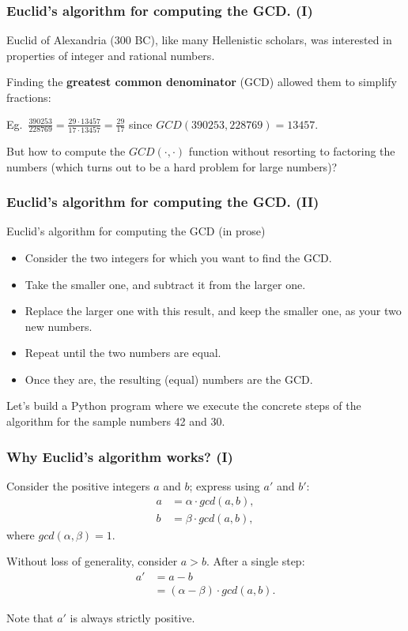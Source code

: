 \documentclass{beamer} %
\newcommand\emc[1]{\textcolor{brightblue}{\textbf{#1}}}
\begin{document}
\begin{frame}
\frametitle{Euclid's algorithm for computing the GCD. (I)} 

Euclid of Alexandria (300 BC), like many Hellenistic scholars, was interested in properties of integer and rational numbers. 

\vspace{5mm}
Finding the \emc{greatest common denominator} (GCD) allowed them to simplify fractions:

\vspace{5mm}
Eg.\ $\frac{390253}{228769} = \frac{29 \cdot 13457}{17 \cdot 13457} = \frac{29}{17}$ since $GCD(390253, 228769) = 13457$.

\vspace{5mm}
But how to compute the $GCD(\cdot, \cdot)$ function without resorting to factoring the numbers (which turns out to be a hard problem for large numbers)?

\end{frame}

\begin{frame}
\frametitle{Euclid's algorithm for computing the GCD. (II)} 

\begin{block}{Euclid's algorithm for computing the GCD (in prose)}
\begin{itemize}
\item Consider the two integers for which you want to find the GCD.
\item Take the smaller one, and subtract it from the larger one. 
\item Replace the larger one with this result, and keep the smaller one, as your two new numbers. 
\item Repeat until the two numbers are equal. 
\item Once they are, the resulting (equal) numbers are the GCD.  
\end{itemize}
\end{block}

Let's build a Python program where we execute the concrete steps of the algorithm for the sample numbers 42 and 30.

\end{frame}

\begin{frame}
\frametitle{Why Euclid's algorithm works? (I)}

Consider the positive integers $a$ and $b$; express using $a'$ and $b'$:
\begin{align}
a &= \alpha \cdot gcd(a,b), \\
b &= \beta \cdot gcd(a,b),
\end{align}
where $gcd(\alpha, \beta) = 1.$

Without loss of generality, consider $a > b$. After a single step:
\begin{align}
a' &= a - b \\ 
    &= (\alpha - \beta) \cdot gcd(a,b).
\end{align}

Note that $a'$ is always strictly positive.

\end{frame}
\end{document}
